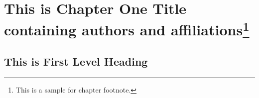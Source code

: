 \bgroup

\chapter[This is Chapter One Title containing authors and affiliations]{This is Chapter One Title containing authors and affiliations\protect\footnote{This is a sample for chapter footnote.}}

\author*[1]{Author I}
\author[2]{Author II}
\author[1]{Author III}
\author[3]{Author IV}

\address[1]{, 
, 
, , 
     , , }%

\address[2]{, 
, 
, , 
     , , }%

\address[3]{, 
, 
, , 
     , , }%

\address*{Corresponding Author: Author; }

\maketitle%

\begin{abstract}{Abstract Title Here}
Abstract para text. Abstract para text. Abstract para text. Abstract para text. 
Abstract para text. Abstract para text. Abstract para text. Abstract para text.

Abstract next para text. Abstract para text. Abstract para text. Abstract para text. 
Abstract para text. If multiple abstracts exists, then \textbf{absgroup} tag 
will be inserted by the tool.
\end{abstract}

\begin{abstract}{}
Abstract text. Abstract text. Abstract text. Abstract text. 
\end{abstract}


\section{This is First Level Heading}

